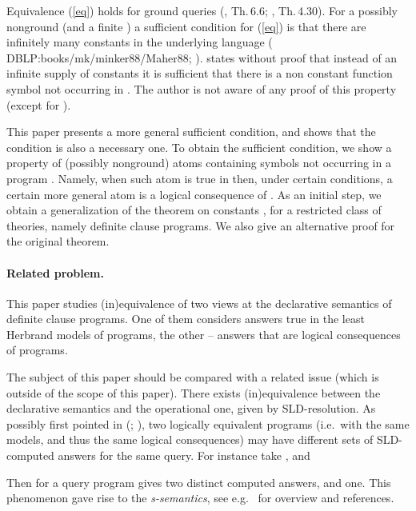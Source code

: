 \documentclass[a4paper]{tlp2}
\begin{document}
Equivalence (\ref{eq}) holds for ground queries
(, Th.\,6.6;\,\,, Th.\,4.30).
For a possibly nonground  (and a finite )
a sufficient condition for (\ref{eq})
is that there are infinitely many constants in the
underlying language
(\citeNP
{DBLP:books/mk/minker88/Maher88};  ).
 states without proof
that instead of an infinite supply of constants it is sufficient that there is
a non constant function symbol not occurring in . 
The author is not aware of any proof of this property
(except for \cite[Appendix]{drabent.arxiv.coco14}).

This paper presents a more general sufficient condition,
and shows that the condition is also a necessary one.
To obtain the sufficient condition, we show a property of (possibly
nonground) atoms containing symbols not occurring in a program . 
Namely, when such atom is true in  then, under certain conditions, a
certain more general atom is a logical consequence of .
As an initial step, we obtain
a generalization of the theorem on constants \cite{shoenfield67},
for a restricted class of theories, namely definite clause programs.
We also give an alternative proof for the original theorem.









\paragraph{Related problem.}

This paper studies (in)equivalence of
two views at the declarative semantics of definite
clause programs.  One of them considers answers true in the least Herbrand
models of programs, the other -- answers that are logical consequences of
programs.  
 


The subject of this paper should be compared with a related issue
(which is outside of the scope of this paper).
There exists (in)equivalence between the declarative
semantics and the operational one, given by SLD-resolution.  
  As possibly first pointed in
(;\,\,),
two logically equivalent programs 
(i.e.\ with the same models, and thus the same logical consequences)
may have different sets of SLD-computed answers for the same query.
For instance take
, and 

Then for a query  program  gives two distinct computed answers,
and  one.  This phenomenon gave rise to the {\em s-semantics}, 
see e.g.\ \cite{DBLP:journals/tcs/Bossi09} for overview and references.
\end{document}
